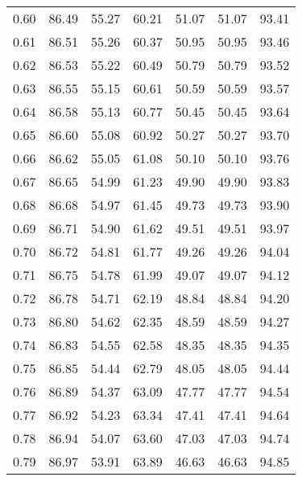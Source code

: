 \begin{tabular}{|c|c|c|c|c|c|c|}
      0.60 &     86.49 &     55.27 &      60.21 &   51.07 &      51.07 &         93.41 \\
      0.61 &     86.51 &     55.26 &      60.37 &   50.95 &      50.95 &         93.46 \\
      0.62 &     86.53 &     55.22 &      60.49 &   50.79 &      50.79 &         93.52 \\
      0.63 &     86.55 &     55.15 &      60.61 &   50.59 &      50.59 &         93.57 \\
      0.64 &     86.58 &     55.13 &      60.77 &   50.45 &      50.45 &         93.64 \\
      0.65 &     86.60 &     55.08 &      60.92 &   50.27 &      50.27 &         93.70 \\
      0.66 &     86.62 &     55.05 &      61.08 &   50.10 &      50.10 &         93.76 \\
      0.67 &     86.65 &     54.99 &      61.23 &   49.90 &      49.90 &         93.83 \\
      0.68 &     86.68 &     54.97 &      61.45 &   49.73 &      49.73 &         93.90 \\
      0.69 &     86.71 &     54.90 &      61.62 &   49.51 &      49.51 &         93.97 \\
      0.70 &     86.72 &     54.81 &      61.77 &   49.26 &      49.26 &         94.04 \\
      0.71 &     86.75 &     54.78 &      61.99 &   49.07 &      49.07 &         94.12 \\
      0.72 &     86.78 &     54.71 &      62.19 &   48.84 &      48.84 &         94.20 \\
      0.73 &     86.80 &     54.62 &      62.35 &   48.59 &      48.59 &         94.27 \\
      0.74 &     86.83 &     54.55 &      62.58 &   48.35 &      48.35 &         94.35 \\
      0.75 &     86.85 &     54.44 &      62.79 &   48.05 &      48.05 &         94.44 \\
      0.76 &     86.89 &     54.37 &      63.09 &   47.77 &      47.77 &         94.54 \\
      0.77 &     86.92 &     54.23 &      63.34 &   47.41 &      47.41 &         94.64 \\
      0.78 &     86.94 &     54.07 &      63.60 &   47.03 &      47.03 &         94.74 \\
      0.79 &     86.97 &     53.91 &      63.89 &   46.63 &      46.63 &         94.85 \\

\end{tabular}
